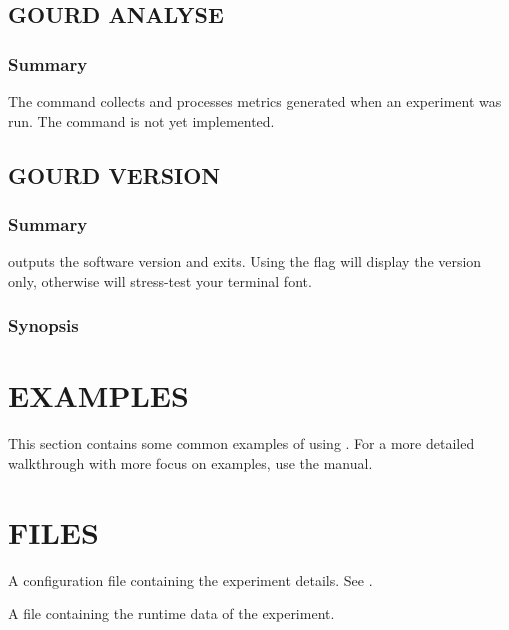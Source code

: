 \documentclass[a4paper,english]{article}
\begin{document}
\begin{adjustwidth}{18pt}{0pt}
        \subsection{GOURD ANALYSE}

            \subsubsection{Summary}
                The   command collects and processes metrics generated
                when an experiment was run.
                The command is not yet implemented.

        \subsection{GOURD VERSION}

            \subsubsection{Summary}
                  outputs the software version and exits.
                Using the  flag will display the version only, otherwise 
                will stress-test your terminal font.

            \subsubsection{Synopsis}
                  



    \section{EXAMPLES}

        This section contains some common examples of using .
        For a more detailed walkthrough with more focus on examples, use the  manual.




    \section{FILES}

        \begin{Description}[Files]\setlength{\itemsep}{0cm}
            \item[\File{gourd.toml}] A configuration file containing the experiment details. See .
            \item[\File{<experiment-dir>/<experiment-number>.lock}] A file containing the runtime data of the experiment.
        \end{Description}


\end{adjustwidth}
\end{document}
